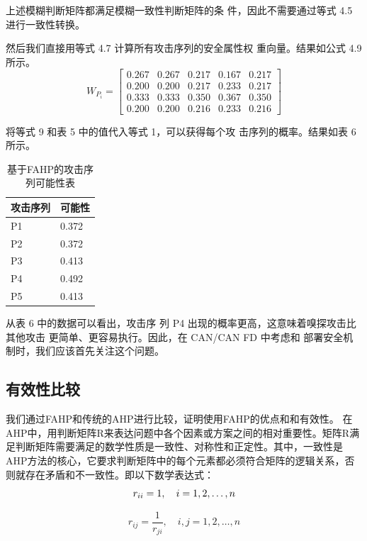 上述模糊判断矩阵都满足模糊一致性判断矩阵的条
件，因此不需要通过等式 4.5 进行一致性转换。

然后我们直接用等式 4.7 计算所有攻击序列的安全属性权
重向量。结果如公式 4.9 所示。
\begin{equation}
    W_{P_i}=\left[\begin{array}{lllll}
    0.267 & 0.267 & 0.217 & 0.167 & 0.217 \\
    0.200 & 0.200 & 0.217 & 0.233 & 0.217 \\
    0.333 & 0.333 & 0.350 & 0.367 & 0.350 \\
    0.200 & 0.200 & 0.216 & 0.233 & 0.216
    \end{array}\right]
    \end{equation}

将等式 9 和表 5 中的值代入等式 1，可以获得每个攻
击序列的概率。结果如表 6 所示。
\begin{table}
  \caption{基于FAHP的攻击序列可能性表}
\begin{center}
    \begin{tabular}{|l|l}
      \hline 攻击序列 & 可能性 \\
      \hline P1 & 0.372 \\
      \hline P2 & 0.372 \\
      \hline P3 & 0.413 \\
      \hline P4 & 0.492 \\
      \hline P5 & 0.413 \\\hline
      \end{tabular}
  \end{center}
\end{table}
从表 6 中的数据可以看出，攻击序
列 P4 出现的概率更高，这意味着嗅探攻击比其他攻击
更简单、更容易执行。因此，在 CAN/CAN FD 中考虑和
部署安全机制时，我们应该首先关注这个问题。
\subsection{有效性比较}
我们通过FAHP和传统的AHP进行比较，证明使用FAHP的优点和和有效性。
在AHP中，用判断矩阵R来表达问题中各个因素或方案之间的相对重要性。矩阵R满足判断矩阵需要满足的数学性质是一致性、对称性和正定性。其中，一致性是AHP方法的核心，它要求判断矩阵中的每个元素都必须符合矩阵的逻辑关系，否则就存在矛盾和不一致性。即以下数学表达式：
\begin{equation}
  r_{i i}=1, \quad i=1,2, \ldots, n \\
\end{equation}

\begin{equation}
  r_{i j}=\frac{1}{r_{j i}}, \quad i, j=1,2, \ldots, n
\end{equation}

